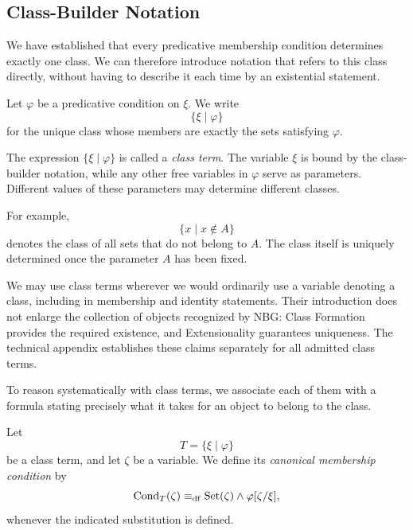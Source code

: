 \subsection{Class-Builder Notation}
\label{sec:class-builder-notation}

We have established that every predicative membership condition determines exactly one class. We can therefore introduce notation that refers to this class directly, without having to describe it each time by an existential statement.

\begin{definition}
\label{def:class-builder-notation}
Let \(\varphi\) be a predicative condition on \(\xi\). We write
\[
\{\xi\mid\varphi\}
\]
for the unique class whose members are exactly the sets satisfying \(\varphi\).
\end{definition}

The expression \(\{\xi\mid\varphi\}\) is called a \emph{class term}. The variable \(\xi\) is bound by the class-builder notation, while any other free variables in \(\varphi\) serve as parameters. Different values of these parameters may determine different classes.

For example,
\[
\{x\mid x\notin A\}
\]
denotes the class of all sets that do not belong to \(A\). The class itself is uniquely determined once the parameter \(A\) has been fixed.

We may use class terms wherever we would ordinarily use a variable denoting a class, including in membership and identity statements. Their introduction does not enlarge the collection of objects recognized by NBG: Class Formation provides the required existence, and Extensionality guarantees uniqueness. The technical appendix establishes these claims separately for all admitted class terms.


To reason systematically with class terms, we associate each of them with a formula stating precisely what it takes for an object to belong to the class.

\begin{definition}
\label{def:canonical-membership-condition}
Let
\[
T=\{\xi\mid\varphi\}
\]
be a class term, and let \(\zeta\) be a variable. We define its \emph{canonical membership condition} by
\[
\operatorname{Cond}_T(\zeta)
\mathrel{\equiv_{\mathrm{df}}}
\operatorname{Set}(\zeta)\land\varphi[\zeta/\xi],
\]
whenever the indicated substitution is defined.
\end{definition}

